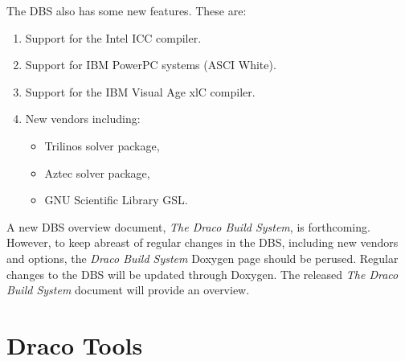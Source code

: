 \documentclass[note]{ResearchNote_pdf}
\begin{document}
The DBS also has some new features.  These are:
\begin{enumerate}
\item Support for the \textsf{Intel ICC} compiler.
\item Support for IBM PowerPC systems (ASCI White).
\item Support for the IBM \textsf{Visual Age xlC} compiler.
\item New vendors including:
  \begin{itemize}
  \item Trilinos solver package,
  \item Aztec solver package,
  \item GNU Scientific Library GSL.
  \end{itemize}
\end{enumerate}

A new DBS overview document, \textit{The Draco Build System}, is
forthcoming.  However, to keep abreast of regular changes in the DBS,
including new vendors and options, the \textit{Draco Build System}
\textsf{Doxygen} \cite{doxygen} page should be perused.  Regular
changes to the DBS will be updated through \textsf{Doxygen}.  The
released \textit{The Draco Build System} document will provide an
overview.


\section{Draco Tools}
\end{document}
